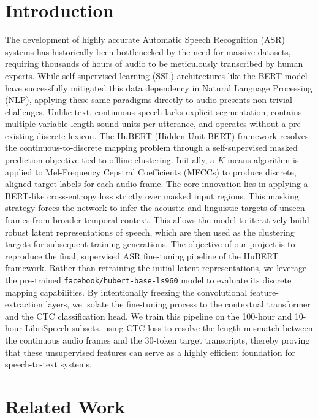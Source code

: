 \documentclass[conference]{IEEEtran}
\begin{document}
\section{Introduction}
The development of highly accurate Automatic Speech Recognition (ASR) systems has historically been bottlenecked by the need for massive datasets, requiring thousands of hours of audio to be meticulously transcribed by human experts.
While self-supervised learning (SSL) architectures like the BERT model have successfully mitigated this data dependency in Natural Language Processing (NLP), applying these same paradigms directly to audio presents non-trivial challenges.
Unlike text, continuous speech lacks explicit segmentation, contains multiple variable-length sound units per utterance, and operates without a pre-existing discrete lexicon.
The HuBERT (Hidden-Unit BERT) framework resolves the continuous-to-discrete mapping problem through a self-supervised masked prediction objective tied to offline clustering.
Initially, a $K$-means algorithm is applied to Mel-Frequency Cepstral Coefficients (MFCCs) to produce discrete, aligned target labels for each audio frame.
The core innovation lies in applying a BERT-like cross-entropy loss strictly over masked input regions.
This masking strategy forces the network to infer the acoustic and linguistic targets of unseen frames from broader temporal context.
This allows the model to iteratively build robust latent representations of speech, which are then used as the clustering targets for subsequent training generations.
The objective of our project is to reproduce the final, supervised ASR fine-tuning pipeline of the HuBERT framework.
Rather than retraining the initial latent representations, we leverage the pre-trained \texttt{facebook/hubert-base-ls960} model to evaluate its discrete mapping capabilities.
By intentionally freezing the convolutional feature-extraction layers, we isolate the fine-tuning process to the contextual transformer and the CTC classification head.
We train this pipeline on the 100-hour and 10-hour LibriSpeech subsets, using CTC loss to resolve the length mismatch between the continuous audio frames and the 30-token target transcripts, thereby proving that these unsupervised features can serve as a highly efficient foundation for speech-to-text systems.

\section{Related Work}
\end{document}
